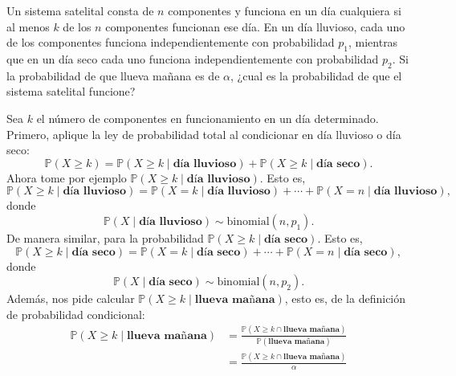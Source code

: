 \question\label{q:2}%
	Un sistema satelital consta de $n$ componentes y funciona en un día cualquiera si al menos $k$ de los $n$ componentes funcionan ese día. En un día lluvioso, cada uno de los componentes funciona independientemente con probabilidad $p_1$, mientras que en un día seco cada uno funciona independientemente con probabilidad $p_2$. Si la probabilidad de que llueva mañana es de $\alpha$, ¿cual es la probabilidad de que el sistema satelital funcione?

	\begin{solutionorlines}
		Sea $k$ el número de componentes en funcionamiento en un día determinado. Primero, aplique la ley de probabilidad total al condicionar en día lluvioso o día seco:
		\begin{equation*}
		\mathds{P}\left(X\ge k\right)=\mathds{P}\left(X\ge k\mid\textbf{día lluvioso}\right)+\mathds{P}\left(X\ge k\mid\textbf{día seco}\right).
		\end{equation*}
		Ahora tome por ejemplo $\mathds{P}\left(X\ge k\mid \textbf{día lluvioso}\right)$. Esto es,
		\begin{equation*}
		\mathds{P}\left(X\ge k\mid\textbf{día lluvioso}\right)=\mathds{P}\left(X=k\mid\textbf{día lluvioso}\right)+\cdots+\mathds{P}\left(X=n\mid\textbf{día lluvioso}\right),
		\end{equation*}
		donde
		\begin{equation*}
		\mathds{P}\left(X\mid\textbf{día lluvioso}\right)\sim\mathrm{binomial}\left(n,p_1\right).
		\end{equation*}
		De manera similar, para la probabilidad $\mathds{P}\left(X\ge k\mid \textbf{día seco}\right)$. Esto es,
		\begin{equation*}
		\mathds{P}\left(X\ge k\mid\textbf{día seco}\right)=\mathds{P}\left(X=k\mid\textbf{día seco}\right)+\cdots+\mathds{P}\left(X=n\mid\textbf{día seco}\right),
		\end{equation*}
		donde
		\begin{equation*}
		\mathds{P}\left(X\mid\textbf{día seco}\right)\sim\mathrm{binomial}\left(n,p_2\right).
		\end{equation*}
		Además, nos pide calcular $\mathds{P}\left(X\ge k\mid \textbf{llueva mañana} \right)$, esto es, de la definición de probabilidad condicional:
		\begin{align*}
		\mathds{P}\left(X\ge k\mid \textbf{llueva mañana} \right)
		&=\frac{\mathds{P}\left(X\ge k\cap \textbf{llueva mañana} \right)}{\mathds{P}\left(\textbf{llueva mañana} \right)}\\
		&=\frac{\mathds{P}\left(X\ge k\cap \textbf{llueva mañana} \right)}{\alpha}
		\end{align*}


\end{solutionorlines}
